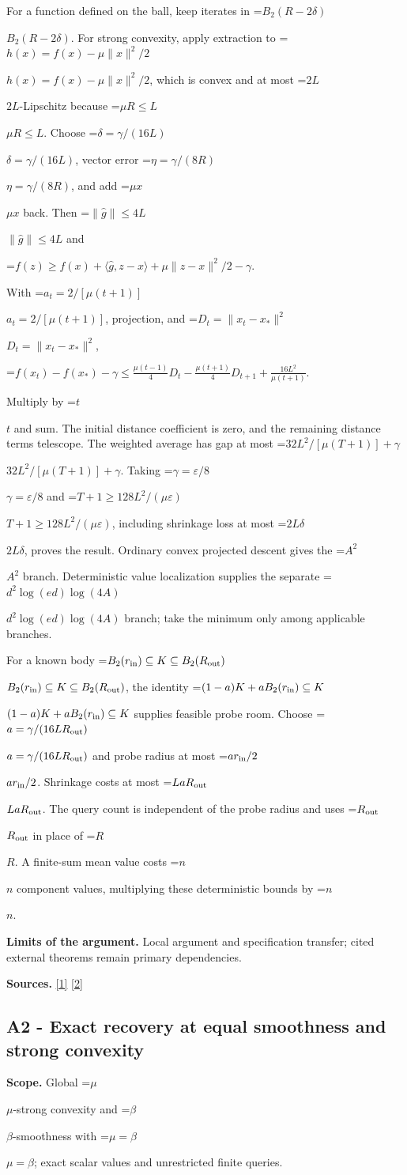 \documentclass[10pt,a4paper]{article}
\newcommand{\AtlasMath}[1]{\par\begingroup\centering\setbox0=\hbox{$\displaystyle #1$}\ifdim\wd0>1.4\linewidth\typeout{ATLAS WIDE FORMULA: \the\wd0}\fi\ifdim\wd0>\linewidth\resizebox{\linewidth}{!}{\box0}\else\box0\fi\par\endgroup}
\newcommand{\AtlasInlineMath}[1]{\begingroup\setbox0=\hbox{$#1$}\ifdim\wd0>.4\linewidth\endgroup\AtlasMath{#1}\else\endgroup$#1$\fi}
\begin{document}
For a function defined on the ball, keep iterates in \AtlasInlineMath{B_2(R-2\delta)}. For strong convexity, apply extraction to \AtlasInlineMath{h(x)=f(x)-\mu\|x\|^2/2}, which is convex and at most \AtlasInlineMath{2L}-Lipschitz because \AtlasInlineMath{\mu R\le L}. Choose \AtlasInlineMath{\delta=\gamma/(16L)}, vector error \AtlasInlineMath{\eta=\gamma/(8R)}, and add \AtlasInlineMath{\mu x} back. Then \AtlasInlineMath{\|\widehat g\|\le4L} and

\AtlasMath{f(z)\ge f(x)+\langle\widehat g,z-x\rangle+\mu\|z-x\|^2/2-\gamma.}

With \AtlasInlineMath{a_t=2/[\mu(t+1)]}, projection, and \AtlasInlineMath{D_t=\|x_t-x_*\|^2},

\AtlasMath{f(x_t)-f(x_*)-\gamma\le\frac{\mu(t-1)}4D_t-\frac{\mu(t+1)}4D_{t+1}+\frac{16L^2}{\mu(t+1)}.}

Multiply by \AtlasInlineMath{t} and sum. The initial distance coefficient is zero, and the remaining distance terms telescope. The weighted average has gap at most \AtlasInlineMath{32L^2/[\mu(T+1)]+\gamma}. Taking \AtlasInlineMath{\gamma=\varepsilon/8} and \AtlasInlineMath{T+1\ge128L^2/(\mu\varepsilon)}, including shrinkage loss at most \AtlasInlineMath{2L\delta}, proves the result. Ordinary convex projected descent gives the \AtlasInlineMath{A^2} branch. Deterministic value localization supplies the separate \AtlasInlineMath{d^2\log(ed)\log(4A)} branch; take the minimum only among applicable branches.

For a known body \AtlasInlineMath{B_2(r_{\rm in})\subseteq K\subseteq B_2(R_{\rm out})}, the identity \AtlasInlineMath{(1-a)K+aB_2(r_{\rm in})\subseteq K} supplies feasible probe room. Choose \AtlasInlineMath{a=\gamma/(16LR_{\rm out})} and probe radius at most \AtlasInlineMath{ar_{\rm in}/2}. Shrinkage costs at most \AtlasInlineMath{LaR_{\rm out}}. The query count is independent of the probe radius and uses \AtlasInlineMath{R_{\rm out}} in place of \AtlasInlineMath{R}. A finite-sum mean value costs \AtlasInlineMath{n} component values, multiplying these deterministic bounds by \AtlasInlineMath{n}.

\textbf{Limits of the argument.} Local argument and specification transfer; cited external theorems remain primary dependencies.

\textbf{Sources.} \href{https://arxiv.org/html/2607.16558v2}{[1]} \href{https://www.mathnet.ru/php/archive.phtml?jrnid=mzm&option_lang=eng&paperid=1697&wshow=paper}{[2]}

\subsection{A2 - Exact recovery at equal smoothness and strong convexity}
\textbf{Scope.} Global \AtlasInlineMath{\mu}-strong convexity and \AtlasInlineMath{\beta}-smoothness with \AtlasInlineMath{\mu=\beta}; exact scalar values and unrestricted finite queries.
\end{document}
